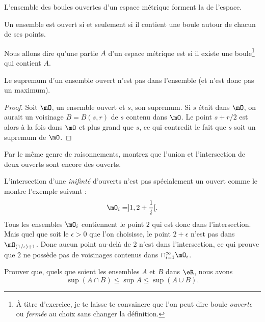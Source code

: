 \begin{definition}
L'ensemble des boules ouvertes d'un espace métrique forment la  de l'espace.
\end{definition}

Un ensemble est ouvert si et seulement si il contient une boule autour de chacun de ses points.

Nous allons dire qu'une partie $A$ d'un espace métrique est  si il existe une boule\footnote{À titre d'exercice, je te laisse te convaincre que l'on peut dire boule \emph{ouverte} ou \emph{fermée} au choix sans changer la définition.} qui contient $A$.

\begin{lemma}  \label{LemSupOuvPas}
Le supremum d'un ensemble ouvert n'est pas dans l'ensemble (et n'est donc pas un maximum).
\end{lemma}

\begin{proof}
Soit $\mO$, un ensemble ouvert et $s$, son supremum. Si $s$ était dans $\mO$, on aurait un voisinage $B=B(s,r)$ de $s$ contenu dans $\mO$. Le point $s+r/2$ est alors à la fois dans $\mO$ et plus grand que $s$, ce qui contredit le fait que $s$ soit un supremum de $\mO$.
\end{proof}

\begin{exercice}
Par le même genre de raisonnements, montrez que l'union et l'intersection de deux ouverts sont encore des ouverts.
\end{exercice}

\begin{remark}
L'intersection d'une \emph{inifinté} d'ouverts n'est pas spécialement un ouvert comme le montre l'exemple suivant :
\[ 
  \mO_i=]1,2+\frac{ 1 }{ i }[.
\]
Tous les ensembles $\mO_i$ contiennent le point $2$ qui est donc dans l'intersection. Mais quel que soit le $\epsilon>0$ que l'on choisisse, le point $2+\epsilon$ n'est pas dans $\mO_{(1/\epsilon)+1}$. Donc aucun point au-delà de $2$ n'est dans l'intersection, ce qui prouve que $2$ ne possède pas de voisinages contenus dans $\cap_{i=1}^{\infty}\mO_i$.
\end{remark}

\begin{exercice}
Prouver que, quels que soient les ensembles $A$ et $B$ dans $\eR$, nous avons
\[ 
  \sup(A\cap B)\leq\sup A\leq\sup(A\cup B).
\]
\end{exercice}



